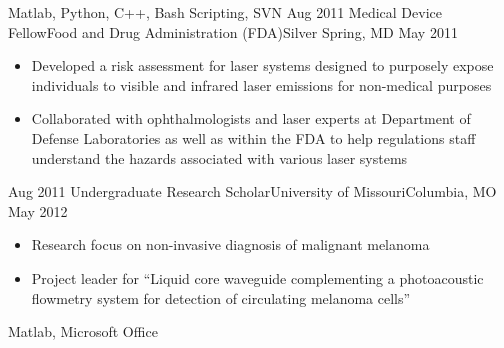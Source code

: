 \begin{experiences}
{\begin{itemize}
                      \end{itemize}
                    }
                    {Matlab, Python, C++, Bash Scripting, SVN}
  \emptySeparator
  \experience
    {Aug 2011}     {Medical Device Fellow}{Food and Drug Administration (FDA)}{Silver Spring, MD}
    {May 2011}    {
                      \begin{itemize}
                        \item Developed a risk assessment for laser systems designed to purposely expose individuals to visible and infrared laser emissions for non-medical purposes
                        \item Collaborated with ophthalmologists and laser experts at Department of Defense Laboratories as well as within the FDA to help regulations staff understand the hazards associated with various laser systems              
                      \end{itemize}
                    }
                    {}
  \emptySeparator
  \experience
    {Aug 2011}     {Undergraduate Research Scholar}{University of Missouri}{Columbia, MO}
    {May 2012}    {
                      \begin{itemize}
                        \item Research focus on non-invasive diagnosis of malignant melanoma
                        \item Project leader for “Liquid core waveguide complementing a photoacoustic flowmetry system for detection of circulating melanoma cells”             
                      \end{itemize}
                    }
                    {Matlab, Microsoft Office}
    
 
\end{experiences}
